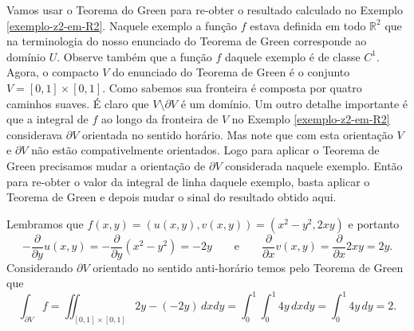 \begin{exemplo}
Vamos usar o Teorema do Green para re-obter o resultado calculado no Exemplo \ref{exemplo-z2-em-R2}.
Naquele exemplo a função $f$ estava definida em todo $\mathbb{R}^2$ que na terminologia do nosso enunciado
do Teorema de Green corresponde ao domínio $U$. Observe também que a função $f$ daquele exemplo
é de classe $C^1$.  Agora, o compacto $V$ do enunciado do Teorema de Green 
é o conjunto  $V=[0,1]\times[0,1]$. Como sabemos sua fronteira é composta por quatro caminhos suaves.
É claro que $V\setminus\partial V$ é um domínio. Um outro detalhe importante é que
a integral de $f$ ao longo da fronteira de $V$ no Exemplo \ref{exemplo-z2-em-R2} 
considerava $\partial V$ orientada no sentido horário. 
Mas note que com esta orientação $V$ e $\partial V$ não estão compativelmente orientados. 
Logo  para aplicar o Teorema de Green precisamos mudar a orientação de $\partial V$ considerada naquele exemplo.
Então para re-obter o valor da integral de linha daquele exemplo, basta 
aplicar o Teorema de Green e depois mudar o  sinal do resultado obtido aqui.

Lembramos que $f(x,y)=(u(x,y),v(x,y))=(x^2-y^2,2xy)$ e portanto 
\[
-\frac{\partial }{\partial y}u(x,y) = -\frac{\partial}{\partial y}(x^2-y^2)= -2y
\qquad\text{e}\qquad
\frac{\partial}{\partial x}v(x,y) = \frac{\partial}{\partial x}2xy = 2y.
\]
Considerando $\partial V$ orientado no sentido anti-horário temos pelo Teorema de 
Green que 
\[
\int_{\partial V} f = \iint_{[0,1]\times[0,1]} 2y-(-2y)\, dxdy = \int_{0}^{1}\int_{0}^{1} 4y \, dxdy = \int_{0}^{1}4y\, dy =2.
\]

\end{exemplo}




























